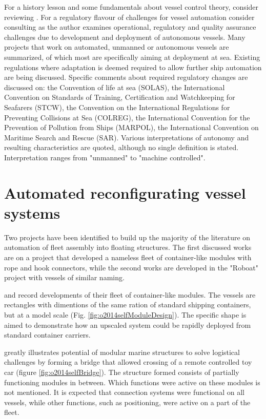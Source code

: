 For a history lesson and some fundamentals about vessel control theory, consider reviewing \citet{clarke2003foundations}.
For a regulatory flavour of challenges for vessel automation consider consulting \citet{komianos2018autonomous} as the author examines operational, regulatory and quality assurance challenges due to development and deployment of autonomous vessels. Many projects that work on automated, unmanned or autonomous vessels are summarized, of which most are specifically aiming at deployment at sea. Existing regulations where adaptation is deemed required to allow further ship automation are being discussed. Specific comments about required regulatory changes are discussed on: the Convention of life at sea (SOLAS), the International Convention on Standards of Training, Certification and Watchkeeping for Seafarers (STCW), the Convention on the International Regulations for Preventing Collisions at Sea (COLREG), the International Convention for the Prevention of Pollution from Ships (MARPOL), the International Convention on Maritime Search and Rescue (SAR). Various  interpretations of autonomy and resulting characteristics are quoted, although no single definition is stated. Interpretation ranges from "unmanned" to "machine controlled".

\section{Automated reconfigurating vessel systems}
\label{literatureAutomatedAssemblySystems}

Two projects have been identified to build up the majority of the literature on automation of fleet assembly into floating structures. The first discussed works are on a project that developed a nameless fleet of container-like modules with rope and hook connectors, while the second works are developed in the "Roboat" project with vessels of similar naming. 

\citet{o2014self} and \citet{paulos2015automated} record developments of their fleet of container-like modules. The vessels are rectangles with dimentions of the same ration of standard shipping containers, but at a model scale (Fig. \ref{fig:o2014selfModuleDesign}). The specific shape is aimed to demonstrate how an upscaled system could be rapidly deployed from standard container carriers. 

\citet{o2014self} greatly illustrates potential of modular marine structures to solve logistical challenges by forming a bridge that allowed crossing of a remote controlled toy car (figure \ref{fig:o2014selfBridge}). The structure formed consists of partially functioning modules in between. Which functions were active on these modules is not mentioned. It is expected that connection systems were functional on all vessels, while other functions, such as positioning, were active on a part of the fleet. 
 
